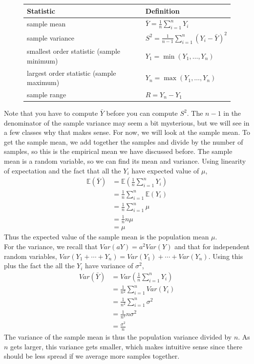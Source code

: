 \documentclass[12pt]{article}
\theoremstyle{definition}
\theoremstyle{remark}
\def\E{{\mathbb E}}
\begin{document}
\begin{figure}[H]
\centering
\label{my-label}
\begin{tabular}{@{}ll@{}}
\toprule
Statistic                                 & Definition                                           \\ \midrule
sample mean                               & $\bar{Y} = \frac{1}{n} \sum_{i=1}^n Y_i$             \\
sample variance                           & $S^2 = \frac{1}{n-1} \sum_{i=1}^n (Y_i - \bar{Y})^2$ \\
smallest order statistic (sample minimum) & $Y_{1} = \min(Y_1, \dots, Y_n)$                      \\
largest order statistic (sample maximum)  & $Y_{n} = \max(Y_1, \dots, Y_n)$                      \\
sample range                              & $R = Y_{n} - Y_{1}$                                  \\ \bottomrule
\end{tabular}
\end{figure}

Note that you have to compute $\bar{Y}$ before you can compute $S^2$. The $n-1$ in the denominator of the sample variance may seem a bit mysterious, but we will see in a few classes why that makes sense. For now, we will look at the sample mean. To get the sample mean, we add together the samples and divide by the number of samples, so this is the empirical mean we have discussed before. The sample mean is a random variable, so we can find its mean and variance. Using linearity of expectation and the fact that all the $Y_i$ have expected value of $\mu$,
\begin{align*}
\E(\bar{Y}) &= \E\left(\frac{1}{n} \sum_{i=1}^n Y_i\right)\\
&= \frac{1}{n} \sum_{i=1}^n \E(Y_i)\\
&= \frac{1}{n} \sum_{i=1}^n \mu \\
&= \frac{1}{n} n \mu \\
&= \mu
\end{align*}
Thus the expected value of the sample mean is the population mean $\mu$.\\

For the variance, we recall that $Var(aY) = a^2 Var(Y)$ and that for independent random variables, $Var(Y_1 + \cdots + Y_n) = Var(Y_1) + \cdots + Var(Y_n)$. Using this plus the fact the all the $Y_i$ have variance of $\sigma^2$,
\begin{align*}
Var(\bar{Y}) &= Var\left(\frac{1}{n} \sum_{i=1}^n Y_i\right)\\
&= \frac{1}{n^2} \sum_{i=1}^n Var(Y_i)\\
&= \frac{1}{n^2} \sum_{i=1}^n \sigma^2 \\
&= \frac{1}{n^2} n \sigma^2 \\
&= \frac{\sigma^2}{n}
\end{align*}
The variance of the sample mean is thus the population variance divided by $n$. As $n$ gets larger, this variance gets smaller, which makes intuitive sense since there should be less spread if we average more samples together.\\
\end{document}
